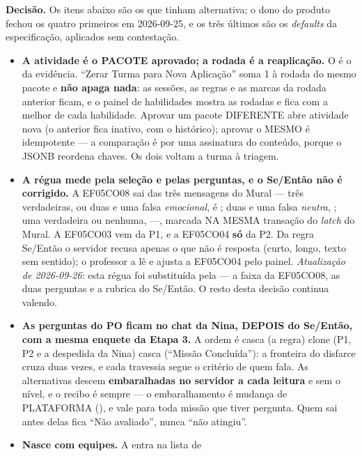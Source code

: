 \textbf{Decisão.} Os itens abaixo são os que tinham alternativa; o dono do
produto fechou os quatro primeiros em 2026-09-25, e os três últimos são os
\emph{defaults} da especificação, aplicados sem contestação.

\begin{itemize}
  \item \textbf{A atividade é o PACOTE aprovado; a rodada é a reaplicação.} O
     é o  da evidência. \enquote{Zerar Turma para
    Nova Aplicação} soma 1 à rodada do mesmo pacote e \textbf{não apaga nada}: as
    sessões, as regras e as marcas da rodada anterior ficam, e o painel de
    habilidades mostra as rodadas e fica com a melhor de cada habilidade.
    Aprovar um pacote DIFERENTE abre atividade nova (o anterior fica inativo,
    com o histórico); aprovar o MESMO é idempotente --- a comparação é por uma
    assinatura do conteúdo, porque o JSONB reordena chaves. Os dois voltam a
    turma à triagem.
  \item \textbf{A régua mede pela seleção e pelas perguntas, e o Se/Então não é
    corrigido.} A EF05CO08 sai das três mensagens do Mural --- três verdadeiras,
    ou duas e uma falsa \emph{emocional}, é ; duas e uma falsa
    \emph{neutra}, ; uma verdadeira ou nenhuma,
     ---, marcada NA MESMA transação do \emph{latch} do Mural. A
    EF05CO03 vem da P1, e a EF05CO04 \textbf{só} da P2. Da regra Se/Então o
    servidor recusa apenas o que não é resposta (curto, longo, texto sem
    sentido); o professor a lê e ajusta a EF05CO04 pelo painel.
    \emph{Atualização de 2026-09-26}: esta régua foi substituída pela
     --- a faixa da EF05CO08, as duas perguntas e a rubrica do
    Se/Então. O resto desta decisão continua valendo.
  \item \textbf{As perguntas do PO ficam no chat da Nina, DEPOIS do Se/Então,
    com a mesma enquete da Etapa 3.} A ordem é casca (a regra) \seta{} clone (P1,
    P2 e a despedida da Nina) \seta{} casca (\enquote{Missão Concluída}): a
    fronteira do disfarce cruza duas vezes, e cada travessia segue o critério
    de quem fala. As alternativas descem \textbf{embaralhadas no servidor a cada
    leitura} e sem o nível, e o recibo é sempre  --- o
    embaralhamento é mudança de PLATAFORMA (), e vale para toda
    missão que tiver pergunta. Quem sai antes delas fica \enquote{Não
    avaliado}, nunca \enquote{não atingiu}.
  \item \textbf{Nasce com equipes.} A  entra na lista de

\end{itemize}
